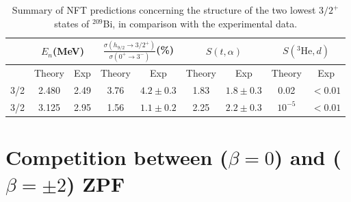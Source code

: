 \begin{table}
	\begin{tabular}{|c|c|c|c|c|c|c|c|c|}
		\hline
		& \multicolumn{2}{|c}{$E_n$(MeV)} & \multicolumn{2}{|c}{$\frac{\sigma(h_{9/2}\rightarrow 3/2^+)}{\sigma(0^+\rightarrow 3^-)}$(\%)} & \multicolumn{2}{|c}{$S(t,\alpha)$}  & \multicolumn{2}{|c|}{$S(^3\text{He},d)$}   \\
		\hline
		&Theory  & Exp  & Theory  & Exp & Theory & Exp & Theory  & Exp  \\
		\hline
		3/2& 2.480 & 2.49  & 3.76  & $4.2\pm0.3$  & 1.83  & $1.8\pm0.3$ &0.02  & $<0.01$  \\
		3/2& 3.125 & 2.95  & 1.56 & $1.1\pm0.2$  & 2.25  & $2.2\pm0.3$ & $10^{-5}$  & $<0.01$  \\
		\hline
	\end{tabular}\caption{Summary of NFT predictions concerning the structure of the two lowest $3/2^+$ states of $^{209}$Bi, in comparison with the experimental data.}\label{tabintroC3}
\end{table}






\FloatBarrier
\section[Competition between ZPF]{Competition between ($\beta=0$) and  ($\beta=\pm2$) ZPF}\label{appintroF}

